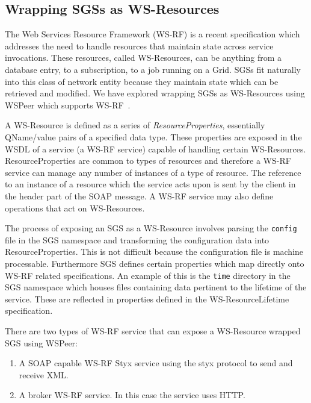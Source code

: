 \documentclass{llncs}
\begin{document}
\subsection{Wrapping SGSs as WS-Resources}
\label{subsec:ws-resources}

The Web Services Resource Framework (WS-RF) is a recent specification which addresses the need to handle resources that maintain state across service invocations. These resources, called WS-Resources, can be anything from a database entry, to a subscription, to a job running on a Grid. SGSs fit naturally into this class of network entity because they maintain state which can be retrieved and modified. We have explored wrapping SGSs as WS-Resources using WSPeer which supports WS-RF~\cite{wsrf}.

\sloppypar A WS-Resource is defined as a series of \emph{ResourceProperties}, essentially QName/value pairs of a specified data type. These properties are exposed in the WSDL of a service (a WS-RF service) capable of handling certain WS-Resources. ResourceProperties are common to types of resources and therefore a WS-RF service can manage any number of instances of a type of resource. The reference to an instance of a resource which the service acts upon is sent by the client in the header part of the SOAP message. A WS-RF service may also define operations that act on WS-Resources.

The process of exposing an SGS as a WS-Resource involves parsing the \texttt{config} file in the SGS namespace and transforming the configuration data into ResourceProperties. This is not difficult because the configuration file is machine processable. Furthermore SGS defines certain properties which map directly onto WS-RF related specifications. An example of this is the \texttt{time} directory in the SGS namespace which houses files containing data pertinent to the lifetime of the service. These are reflected in properties defined in the WS-ResourceLifetime~\cite{wsrf-lifetime} specification.

There are two types of WS-RF service that can expose a WS-Resource wrapped SGS using WSPeer:

\begin{enumerate}
\item A SOAP capable WS-RF Styx service using the styx protocol to send and receive XML.
\item A broker WS-RF service. In this case the service uses HTTP.
\end{enumerate}
\end{document}
